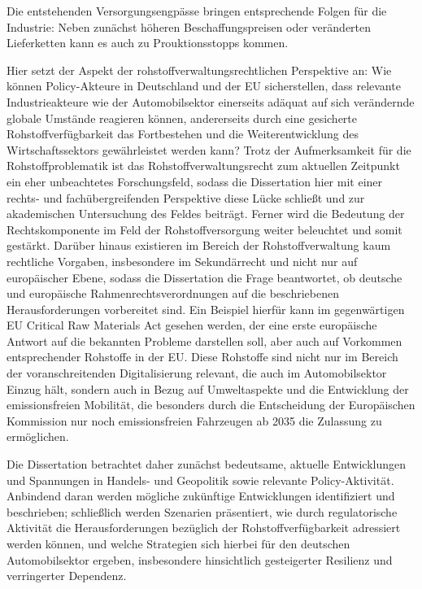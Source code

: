 \documentclass[12pt,a4paper,oneside]{book} %
\begin{document}
	Die entstehenden Versorgungsengpässe bringen entsprechende Folgen für die Industrie: Neben zunächst höheren Beschaffungspreisen oder veränderten Lieferketten kann es auch zu Prouktionsstopps kommen.
	
	Hier setzt der Aspekt der rohstoffverwaltungsrechtlichen Perspektive an: Wie können Policy-Akteure in Deutschland und der EU sicherstellen, dass relevante Industrieakteure wie der Automobilsektor einerseits adäquat auf sich verändernde globale Umstände reagieren können, andererseits durch eine gesicherte Rohstoffverfügbarkeit das Fortbestehen und die Weiterentwicklung des Wirtschaftssektors gewährleistet werden kann? Trotz der Aufmerksamkeit für die Rohstoffproblematik ist das Rohstoffverwaltungsrecht zum aktuellen Zeitpunkt ein eher unbeachtetes Forschungsfeld, sodass die Dissertation hier mit einer rechts- und fachübergreifenden Perspektive diese Lücke schließt und zur akademischen Untersuchung des Feldes beiträgt. Ferner wird die Bedeutung der Rechtskomponente im Feld der Rohstoffversorgung weiter beleuchtet und somit gestärkt. Darüber hinaus existieren im Bereich der Rohstoffverwaltung kaum rechtliche Vorgaben, insbesondere im Sekundärrecht und nicht nur auf europäischer Ebene, sodass die Dissertation die Frage beantwortet, ob deutsche und europäische Rahmenrechtsverordnungen auf die beschriebenen Herausforderungen vorbereitet sind. Ein Beispiel hierfür kann im gegenwärtigen EU Critical Raw Materials Act gesehen werden, der eine erste europäische Antwort auf die bekannten Probleme darstellen soll, aber auch auf Vorkommen entsprechender Rohstoffe in der EU. Diese Rohstoffe sind nicht nur im Bereich der voranschreitenden Digitalisierung relevant, die auch im Automobilsektor Einzug hält, sondern auch in Bezug auf Umweltaspekte und die Entwicklung der emissionsfreien Mobilität, die besonders durch die Entscheidung der Europäischen Kommission nur noch emissionsfreien Fahrzeugen ab 2035 die Zulassung zu ermöglichen.
	
	Die Dissertation betrachtet daher zunächst bedeutsame, aktuelle Entwicklungen und Spannungen in Handels- und Geopolitik sowie relevante Policy-Aktivität. Anbindend daran werden mögliche zukünftige Entwicklungen identifiziert und beschrieben; schließlich werden Szenarien präsentiert, wie durch regulatorische Aktivität die Herausforderungen bezüglich der Rohstoffverfügbarkeit adressiert werden können, und welche Strategien sich hierbei für den deutschen Automobilsektor ergeben, insbesondere hinsichtlich gesteigerter Resilienz und verringerter Dependenz. 
	
\end{document}
